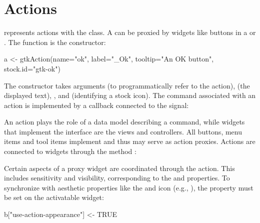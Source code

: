 \section{Actions}
\label{sec:RGtk2:actions}


\GTK\/ represents actions with the  class. A
 can be proxied by widgets like buttons in a
 or .  The 
function is the constructor:
\begin{Schunk}
\begin{Sinput}
 a <- gtkAction(name="ok", label="_Ok", 
                tooltip="An OK button", stock.id="gtk-ok")
\end{Sinput}
\end{Schunk}
%
The constructor takes arguments  (to
programmatically refer to the action), 
(the displayed text), , and
 (identifying a stock icon).  The
command associated with an action is implemented by a callback
connected to the  signal:
\begin{Schunk}
\end{Schunk}


An action plays the role of a data model describing a command, while
widgets that implement the  interface are the
views and controllers. All buttons, menu items and tool items
implement  and thus may serve as action
proxies. Actions are connected to widgets through the method
:
\begin{Schunk}
\end{Schunk}
%
Certain aspects of a proxy widget are coordinated through the
action. This includes sensitivity and visibility, corresponding to the
 and  properties. To synchronize with
aesthetic properties like the  and icon (e.g.,
), the  property must be
set on the activatable widget:
\begin{Schunk}
\begin{Sinput}
 b["use-action-appearance"] <- TRUE
\end{Sinput}
\end{Schunk}

